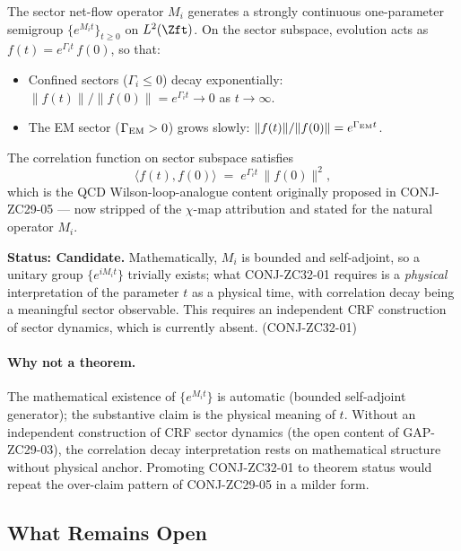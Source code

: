 \documentclass[12pt, a4paper]{article}
\begin{document}
\begin{formalbox}[title={CONJ-ZC32-01 (Candidate): Sector
  semigroup}]
The sector net-flow operator $M_i$ generates a strongly
continuous one-parameter semigroup $\{e^{M_i t}\}_{t \geq 0}$
on $L^2(\Zft)$. On the sector subspace, evolution acts as
$f(t) = e^{\Gamma_i t}\,f(0)$, so that:
\begin{itemize}[leftmargin=*, noitemsep]
  \item Confined sectors ($\Gamma_i \leq 0$) decay
    exponentially: $\|f(t)\|/\|f(0)\| = e^{\Gamma_i t}
    \to 0$ as $t \to \infty$.
  \item The EM sector ($\Gamma_{\rm EM} > 0$) grows slowly:
    $\|f(t)\|/\|f(0)\| = e^{\Gamma_{\rm EM} t}$.
\end{itemize}
The correlation function on sector subspace satisfies
\[
  \bigl\langle f(t), f(0) \bigr\rangle
    \;=\; e^{\Gamma_i t}\,\|f(0)\|^2,
\]
which is the QCD Wilson-loop-analogue content originally
proposed in CONJ-ZC29-05 --- now stripped of the $\chi$-map
attribution and stated for the natural operator $M_i$.

\textbf{Status: Candidate.} Mathematically, $M_i$ is
bounded and self-adjoint, so a unitary group $\{e^{i M_i
t}\}$ trivially exists; what CONJ-ZC32-01 requires is a
\emph{physical} interpretation of the parameter $t$ as a
physical time, with correlation decay being a meaningful
sector observable. This requires an independent CRF
construction of sector dynamics, which is currently absent.
\hfill\textup{(CONJ-ZC32-01)}
\end{formalbox}

\paragraph{Why not a theorem.}
The mathematical existence of $\{e^{M_i t}\}$ is automatic
(bounded self-adjoint generator); the substantive claim is
the physical meaning of $t$. Without an independent
construction of CRF sector dynamics (the open content of
GAP-ZC29-03), the correlation decay interpretation rests on
mathematical structure without physical anchor. Promoting
CONJ-ZC32-01 to theorem status would repeat the over-claim
pattern of CONJ-ZC29-05 in a milder form.

\subsection{What Remains Open}
\label{sec:open}
\end{document}
